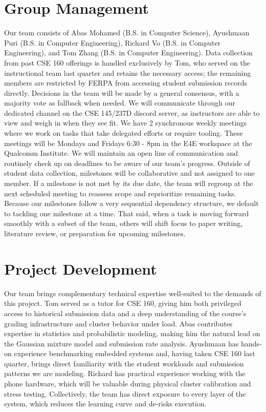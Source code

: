 \documentclass{article}
\begin{document}
\section{Group Management}

Our team consists of Abas Mohamed (B.S. in Computer Science), Ayushmaan Puri (B.S. in Computer Engineering), Richard Vo (B.S. in Computer Engineering), and Tom Zhang (B.S. in Computer Engineering). Data collection from past CSE 160 offerings is handled exclusively by Tom, who served on the instructional team last quarter and retains the necessary access; the remaining members are restricted by FERPA from accessing student submission records directly. Decisions in the team will be made by a general consensus, with a majority vote as fallback when needed. We will communicate through our dedicated channel on the CSE 145/237D discord server, as instructors are able to view and weigh in when they see fit. We have 2 synchronous weekly meetings where we work on tasks that take delegated efforts or require tooling. These meetings will be Mondays and Fridays 6:30 - 8pm in the E4E workspace at the Qualcomm Institute. We will maintain an open line of communication and routinely check up on deadlines to be aware of our team’s progress. Outside of student data collection, milestones will be collaborative and not assigned to one member. If a milestone is not met by its due date, the team will regroup at the next scheduled meeting to reassess scope and reprioritize remaining tasks. Because our milestones follow a very sequential dependency structure, we default to tackling one milestone at a time. That said, when a task is moving forward smoothly with a subset of the team, others will shift focus to paper writing, literature review, or preparation for upcoming milestones.


\section{Project Development}

Our team brings complementary technical expertise well-suited to the demands of this project. Tom served as a tutor for CSE 160, giving him both privileged access to historical submission data and a deep understanding of the course's grading infrastructure and cluster behavior under load.  Abas contributes expertise in statistics and probabilistic modeling, making him the natural lead on the Gaussian mixture model and submission rate analysis. Ayushmaan has hands-on experience benchmarking embedded systems and, having taken CSE 160 last quarter, brings direct familiarity with the student workloads and submission patterns we are modeling. Richard has practical experience working with the phone hardware, which will be valuable during physical cluster calibration and stress testing. Collectively, the team has direct exposure to every layer of the system, which reduces the learning curve and de-risks execution.
\end{document}
